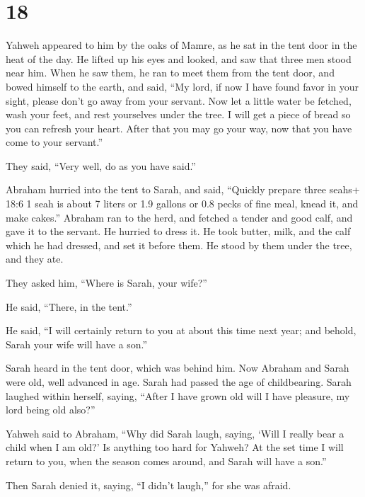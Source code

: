 \hypertarget{section-17}{%
\section{18}\label{section-17}}

 Yahweh appeared to him by the oaks of Mamre, as he sat in
the tent door in the heat of the day.  He lifted up his eyes
and looked, and saw that three men stood near him. When he saw them, he
ran to meet them from the tent door, and bowed himself to the earth,
 and said, ``My lord, if now I have found favor in your
sight, please don't go away from your servant.  Now let a
little water be fetched, wash your feet, and rest yourselves under the
tree.  I will get a piece of bread so you can refresh your
heart. After that you may go your way, now that you have come to your
servant.''

They said, ``Very well, do as you have said.''

 Abraham hurried into the tent to Sarah, and said, ``Quickly
prepare three seahs+ 18:6 1 seah is about 7 liters or 1.9 gallons or 0.8
pecks of fine meal, knead it, and make cakes.''  Abraham ran
to the herd, and fetched a tender and good calf, and gave it to the
servant. He hurried to dress it.  He took butter, milk, and
the calf which he had dressed, and set it before them. He stood by them
under the tree, and they ate.

 They asked him, ``Where is Sarah, your wife?''

He said, ``There, in the tent.''

 He said, ``I will certainly return to you at about this
time next year; and behold, Sarah your wife will have a son.''

Sarah heard in the tent door, which was behind him.  Now
Abraham and Sarah were old, well advanced in age. Sarah had passed the
age of childbearing.  Sarah laughed within herself, saying,
``After I have grown old will I have pleasure, my lord being old also?''

 Yahweh said to Abraham, ``Why did Sarah laugh, saying,
`Will I really bear a child when I am old?'  Is anything
too hard for Yahweh? At the set time I will return to you, when the
season comes around, and Sarah will have a son.''

 Then Sarah denied it, saying, ``I didn't laugh,'' for she
was afraid.

